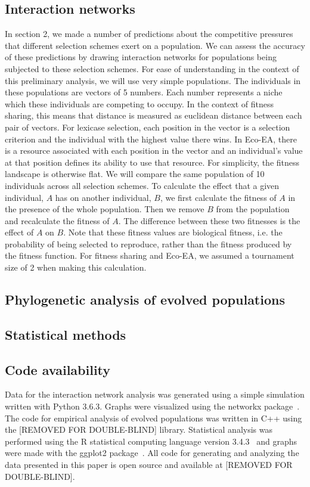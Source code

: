 \subsection{Interaction networks}
In section 2, we made a number of predictions about the competitive pressures that different selection schemes exert on a population. We can assess the accuracy of these predictions by drawing interaction networks for populations being subjected to these selection schemes. For ease of understanding in the context of this preliminary analysis, we will use very simple populations. The individuals in these populations are vectors of 5 numbers. Each number represents a niche which these individuals are competing to occupy. In the context of fitness sharing, this means that distance is measured as euclidean distance between each pair of vectors. For lexicase selection, each position in the vector is a selection criterion and the individual with the highest value there wins. In Eco-EA, there is a resource associated with each position in the vector and an individual's value at that position defines its ability to use that resource. For simplicity, the fitness landscape is otherwise flat. We will compare the same population of 10 individuals across all selection schemes. To calculate the effect that a given individual, $A$ has on another individual, $B$, we first calculate the fitness of $A$ in the presence of the whole population. Then we remove $B$ from the population and recalculate the fitness of $A$. The difference between these two fitnesses is the effect of $A$ on $B$. Note that these fitness values are biological fitness, i.e. the probability of being selected to reproduce, rather than the fitness produced by the fitness function.  For fitness sharing and Eco-EA, we assumed a tournament size of 2 when making this calculation.

\subsection{Phylogenetic analysis of evolved populations}

\subsection{Statistical methods}


\subsection{Code availability}
Data for the interaction network analysis was generated using a simple simulation written with Python 3.6.3. Graphs were visualized using the networkx package~\cite{hagberg_exploring_2008}. The code for empirical analysis of evolved populations was written in C++ using the [REMOVED FOR DOUBLE-BLIND] library. Statistical analysis was performed using the R statistical computing language version 3.4.3~\cite{r_core_team_r:_2017} and graphs were made with the ggplot2 package~\cite{wickham_ggplot2:_2009}. All code for generating and analyzing the data presented in this paper is open source and available at [REMOVED FOR DOUBLE-BLIND]. 

